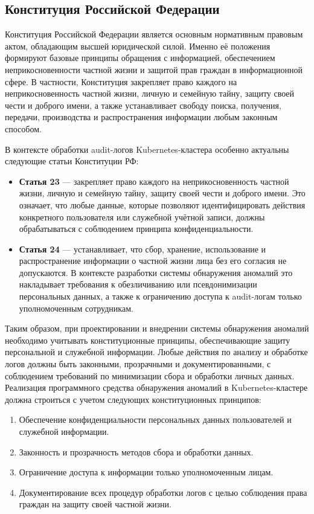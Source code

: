 \subsection{Конституция Российской Федерации}

Конституция Российской Федерации \cite{ConstitutionRF} является основным нормативным правовым актом, обладающим высшей юридической силой. Именно её положения формируют базовые принципы обращения с информацией, обеспечением неприкосновенности частной жизни и защитой прав граждан в информационной сфере. В частности, Конституция закрепляет право каждого на неприкосновенность частной жизни, личную и семейную тайну, защиту своей чести и доброго имени, а также устанавливает свободу поиска, получения, передачи, производства и распространения информации любым законным способом.

В контексте обработки audit-логов Kubernetes-кластера особенно актуальны следующие статьи Конституции РФ:

\begin{itemize}
    \item \textbf{Статья 23} — закрепляет право каждого на неприкосновенность частной жизни, личную и семейную тайну, защиту своей чести и доброго имени. Это означает, что любые данные, которые позволяют идентифицировать действия конкретного пользователя или служебной учётной записи, должны обрабатываться с соблюдением принципа конфиденциальности.
    \item \textbf{Статья 24} — устанавливает, что сбор, хранение, использование и распространение информации о частной жизни лица без его согласия не допускаются. В контексте разработки системы обнаружения аномалий это накладывает требования к обезличиванию или псевдонимизации персональных данных, а также к ограничению доступа к audit-логам только уполномоченным сотрудникам.
\end{itemize}

Таким образом, при проектировании и внедрении системы обнаружения аномалий необходимо учитывать конституционные принципы, обеспечивающие защиту персональной и служебной информации. Любые действия по анализу и обработке логов должны быть законными, прозрачными и документированными, с соблюдением требований по минимизации сбора и обработки личных данных. Реализация программного средства обнаружения аномалий в Kubernetes-кластере должна строиться с учетом следующих конституционных принципов:

\begin{enumerate}
    \item Обеспечение конфиденциальности персональных данных пользователей и служебной информации.
    \item Законность и прозрачность методов сбора и обработки данных.
    \item Ограничение доступа к информации только уполномоченным лицам.
    \item Документирование всех процедур обработки логов с целью соблюдения права граждан на защиту своей частной жизни.
\end{enumerate}